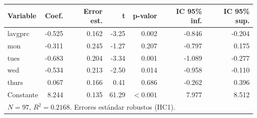 
\begin{tabular}{lrrrrrr}
\toprule
Variable & Coef. & Error est. & t & p-valor & IC 95\% inf. & IC 95\% sup.\\
\midrule
lavgprc & -0.525 & 0.162 & -3.25 & 0.002 & -0.846 & -0.204\\
mon & -0.311 & 0.245 & -1.27 & 0.207 & -0.797 & 0.175\\
tues & -0.683 & 0.204 & -3.34 & 0.001 & -1.089 & -0.277\\
wed & -0.534 & 0.213 & -2.50 & 0.014 & -0.958 & -0.110\\
thurs & 0.067 & 0.166 & 0.41 & 0.686 & -0.262 & 0.396\\
Constante & 8.244 & 0.135 & 61.29 & $<0.001$ & 7.977 & 8.512\\
\midrule
\multicolumn{7}{l}{$N=97$, $R^2=0.2168$. Errores estándar robustos (HC1).}\\
\bottomrule
\end{tabular}
